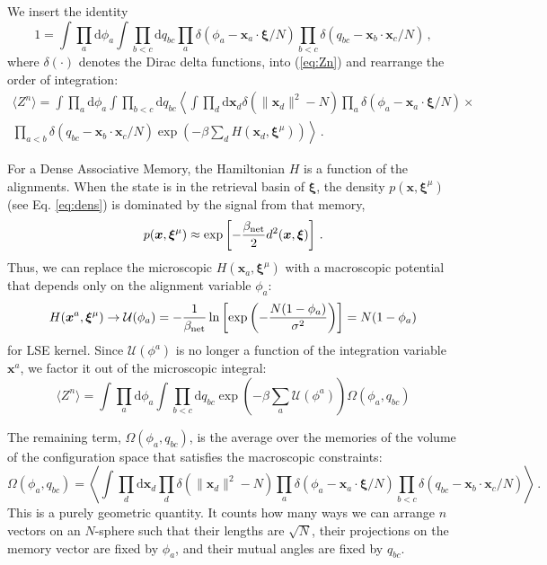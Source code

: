 \documentclass{article}
\newcommand{\dd}{{\mathrm{d}}}
\theoremstyle{plain}
\theoremstyle{definition}
\theoremstyle{remark}
\begin{document}
We insert the identity 
\begin{equation}
1 = \int \prod_a \dd \phi_a \int \prod_{b<c} \dd q_{bc} \prod_a \delta\left(\phi_a - \bm{x}_a \cdot \bm{\xi}/N\right) \prod_{b<c} \delta\left(q_{bc} - \bm{x}_b \cdot \bm{x}_c/N\right)\,,
\end{equation}
where $\delta(\cdot)$ denotes the Dirac delta functions, into (\ref{eq:Zn}) and rearrange the order of integration:
\begin{multline}
\langle Z^n \rangle = \int \prod_a \dd \phi_a \int \prod_{b<c}  \dd q_{bc} \left\langle \int \prod_d \dd \bm{x}_d \delta(\|\bm{x}_d\|^2 - N) \prod_a \delta(\phi_a - \bm{x}_a \cdot \bm{\xi}/N) \right. \times \\
\left. \prod_{a<b} \delta(q_{bc} - \bm{x}_b \cdot \bm{x}_c/N) \exp\left(-\beta \sum_d H(\bm{x}_d, \bm{\xi}^\mu)\right) \right\rangle \,.
\end{multline}

For a Dense Associative Memory, the Hamiltonian $H$ is a function of the alignments. When the state is in the retrieval basin of $\bm{\xi}$, the density $p(\bm{x}, \bm{\xi}^\mu)$ (see Eq. \ref{eq:dens}) is dominated by the signal from that memory,
\begin{equation}
    p(\bm{x}, \bm{\xi}^\mu) \approx \exp\left[ - \frac{\beta_{\rm net}}{2} d^2(\bm{x}, \bm{\xi}) \right] \,.
    \label{eq:dens_red}    
\end{equation}
Thus, we can replace the microscopic $H(\bm{x}_a, \bm{\xi}^\mu)$ with a macroscopic potential that depends only on the alignment variable $\phi_a$:
\begin{equation}
    H(\bm{x}^a, \bm{\xi}^\mu) \to \mathcal{U}(\phi_a) = -\frac{1}{\beta_{\rm net}} \ln \left[  \exp\left( -\frac{N(1 - \phi_a)}{\sigma^2} \right) \right] = N(1-\phi_a)
\end{equation}
for LSE kernel. Since $\mathcal{U}(\phi^a)$ is no longer a function of the integration variable $\bm{x}^a$, we factor it out of the microscopic integral:
\begin{equation}
    \langle Z^n \rangle = \int \prod_a \dd \phi_a \int \prod_{b<c}  \dd q_{bc} \exp\left(-\beta \sum_a \mathcal{U}(\phi^a)\right)  \Omega(\phi_a, q_{bc})
\end{equation}


The remaining term, $\Omega(\phi_a, q_{bc})$, is the average over the memories of the volume of the configuration space that satisfies the macroscopic constraints:
\begin{equation}
\Omega(\phi_a, q_{bc}) = \left\langle \int \prod_d \dd \bm{x}_d \prod_d \delta(\|\bm{x}_d\|^2 - N) \prod_a \delta(\phi_a - \bm{x}_a \cdot \bm{\xi}/N) \prod_{b<c} \delta(q_{bc} - \bm{x}_b \cdot \bm{x}_c/N) \right\rangle\,.
\end{equation}
This is a purely geometric quantity. It counts how many ways we can arrange $n$ vectors on an $N$-sphere such that their lengths are $\sqrt{N}$, their projections on the memory vector are fixed by $\phi_a$, and their mutual angles are fixed by $q_{bc}$.
\end{document}
